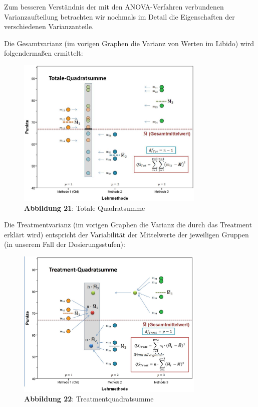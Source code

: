 \documentclass[]{article}
\begin{document}
Zum besseren Verständnis der mit den ANOVA-Verfahren verbundenen Varianzaufteilung betrachten wir nochmals im Detail die Eigenschaften der verschiedenen Varianzanteile.

Die Gesamtvarianz (im vorigen Graphen die Varianz von Werten im Libido) wird folgendermaßen ermittelt:

\begin{figure}
\centering
\includegraphics[width=0.8\textwidth,height=\textheight]{Images/ANOVA_QS_Total_Graphisch.jpg}
\caption{\textbf{Abbildung 21}: Totale Quadratsumme}
\end{figure}

Die Treatmentvarianz (im vorigen Graphen die Varianz die durch das Treatment erklärt wird) entspricht der Variabilität der Mittelwerte der jeweiligen Gruppen (in unserem Fall der Dosierungsstufen):

\begin{figure}
\centering
\includegraphics[width=0.8\textwidth,height=\textheight]{Images/ANOVA_QS_Treatment_Graphisch.jpg}
\caption{\textbf{Abbildung 22}: Treatmentquadratsumme}
\end{figure}
\end{document}
